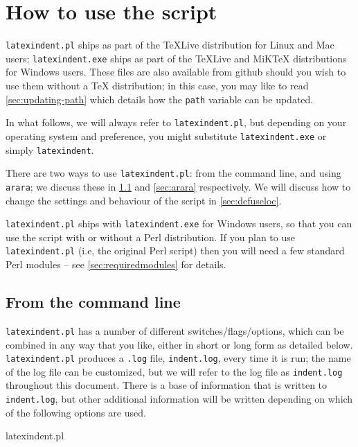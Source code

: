 \section{How to use the script}
 \texttt{latexindent.pl} ships as part of the \TeX Live distribution for
 Linux and Mac users; \texttt{latexindent.exe} ships as part of the \TeX Live
 and MiK\TeX{} distributions for Windows users. These files are also available
 from github \cite{latexindent-home} should you wish to use them without
 a \TeX{} distribution; in this case, you may like to read \vref{sec:updating-path}
 which details how the \texttt{path} variable can be updated.

 In what follows, we will always refer to \texttt{latexindent.pl}, but depending on
 your operating system and preference, you might substitute \texttt{latexindent.exe} or
 simply \texttt{latexindent}.

 There are two ways to use \texttt{latexindent.pl}: from the command line,
 and using \texttt{arara}; we discuss these in \cref{sec:commandline} and
 \cref{sec:arara} respectively. We will discuss how to change the settings and
 behaviour of the script in \vref{sec:defuseloc}.

 \texttt{latexindent.pl} ships with \texttt{latexindent.exe} for Windows
 users, so that you can use the script with or without a Perl distribution.
 If you plan to use \texttt{latexindent.pl} (i.e, the original Perl script) then you will
 need a few standard Perl modules -- see \vref{sec:requiredmodules} for details.

\subsection{From the command line}\label{sec:commandline}
	\texttt{latexindent.pl} has a number of different switches/flags/options, which
	can be combined in any way that you like, either in short or long form as detailed below.
	\texttt{latexindent.pl}  produces a \texttt{.log} file, \texttt{indent.log}, every time it
	is run; the name of the log file can be customized, but we will
	refer to the log file as \texttt{indent.log} throughout this document.
	There is a base of information that is written to \texttt{indent.log},
	but other additional information will be written depending
	on which of the following options are used.

	\begin{commandshell}
latexindent.pl
      \end{commandshell}

